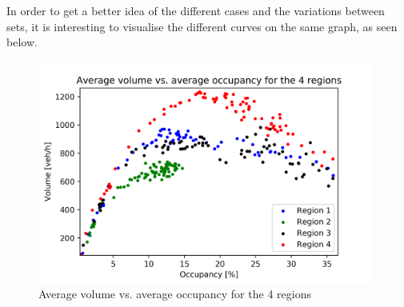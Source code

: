 \documentclass[a4paper, 12pt,oneside]{article}
\begin{document}
In order to get a better idea of the different cases and the variations between sets, it is interesting to visualise the different curves on the same graph, as seen below.\\
\begin{figure}[H]
    \begin{center}
        \includegraphics[width=11cm]{Images/Average volume vs. average occupancy for the 4 region.png}
        \caption{Average volume vs. average occupancy for the 4 regions}
        \label{Average volume vs. average occupancy for the 4 regions}
    \end{center}
\end{figure}
\end{document}
